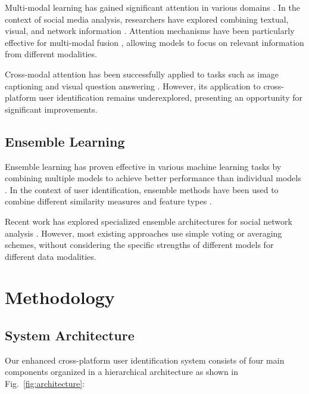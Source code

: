 \documentclass[conference]{IEEEtran}
\begin{document}
Multi-modal learning has gained significant attention in various domains \cite{baltrusaitis2018multimodal}. In the context of social media analysis, researchers have explored combining textual, visual, and network information \cite{kiela2018dynamic}. Attention mechanisms have been particularly effective for multi-modal fusion \cite{vaswani2017attention}, allowing models to focus on relevant information from different modalities.

Cross-modal attention has been successfully applied to tasks such as image captioning \cite{xu2015show} and visual question answering \cite{lu2016hierarchical}. However, its application to cross-platform user identification remains underexplored, presenting an opportunity for significant improvements.

\subsection{Ensemble Learning}

Ensemble learning has proven effective in various machine learning tasks by combining multiple models to achieve better performance than individual models \cite{dietterich2000ensemble}. In the context of user identification, ensemble methods have been used to combine different similarity measures \cite{carmagnola2008user} and feature types \cite{li2017deep}.

Recent work has explored specialized ensemble architectures for social network analysis \cite{hamilton2017inductive}. However, most existing approaches use simple voting or averaging schemes, without considering the specific strengths of different models for different data modalities.

\section{Methodology}

\subsection{System Architecture}

Our enhanced cross-platform user identification system consists of four main components organized in a hierarchical architecture as shown in Fig.~\ref{fig:architecture}:
\end{document}
